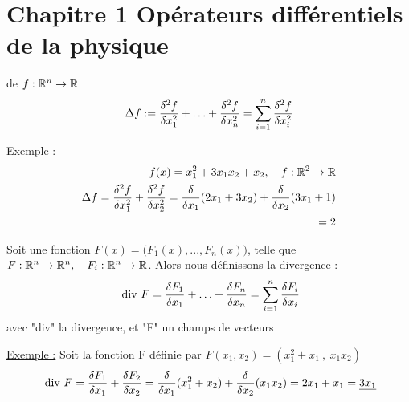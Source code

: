 \documentclass[12pt,a4paper]{article}
\begin{document}
\section[Opérateurs diff. de la physique]{Chapitre 1 Opérateurs différentiels de la physique}
\begin{boite}
	 de $f : \rn \to \R$
	\begin{equation*}
		\Delta f := \frac{\delta^2 f}{\delta x_1^2} + \ldots + \frac{\delta^2 f}{\delta x_n^2} = \somme{n}{i=1} \frac{\delta^2 f}{\delta x_i^2}
	\end{equation*}
\end{boite}
\uline{Exemple :} 
\begin{align*}
	f(x) = x_1^2 + 3x_1x_2 + x_2, \quad f : \R^2 \to \R\\
	\Delta f = \frac{\delta^2 f}{\delta x_1^2} + \frac{\delta^2 f}{\delta x_2^2} = \frac{\delta}{\delta x_1}(2x_1 + 3x_2) +  \frac{\delta }{\delta x_2}(3x_1 + 1)\\
	=2
\end{align*}

\begin{boite}
	 Soit une fonction $F(x) = \big(F_1(x),...,F_n(x)\big)$, telle que $F : \rn \to \rn,\quad F_i : \rn \to \R$. Alors nous définissons la divergence :
	\begin{equation*}
		\text{\dive } F = \frac{\delta F_1}{\delta x_1} +  \ldots + \frac{\delta F_n}{\delta x_n} = \somme{n}{i=1} \frac{\delta F_i}{\delta x_i}
	\end{equation*}
	avec "div" la divergence, et "F" un champs de vecteurs
\end{boite}
\uline{Exemple :} Soit la fonction F définie par $F(x_1,x_2) = (x_1^2 + x_1\ , \ x_1x_2)$
\begin{equation*} 	
	\dive F = \frac{\delta F_1}{\delta x_1} + \frac{\delta F_2}{\delta x_2} = \frac{\delta}{\delta x_1}(x_1^2 + x_2) + \frac{\delta }{\delta x_2}(x_1x_2)= 2x_1 + x_1 = \uline{3x_1}
\end{equation*}
\end{document}
